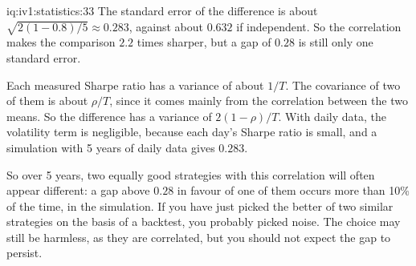 \begin{solution}{iq:iv1:statistics:33}
The standard error of the difference is about $\sqrt{2(1 - 0.8)/5} \approx 0.283$, against about $0.632$ if independent. So the correlation makes the comparison $2.2$ times sharper, but a gap of $0.28$ is still only one standard error.

Each measured Sharpe ratio has a variance of about $1/T$. The covariance of two of them is about $\rho/T$, since it comes mainly from the correlation between the two means. So the difference has a variance of $2(1 - \rho)/T$. With daily data, the volatility term is negligible, because each day's Sharpe ratio is small, and a simulation with 5 years of daily data gives $0.283$.

So over 5 years, two equally good strategies with this correlation will often appear different: a gap above $0.28$ in favour of one of them occurs more than 10\% of the time, in the simulation. If you have just picked the better of two similar strategies on the basis of a backtest, you probably picked noise. The choice may still be harmless, as they are correlated, but you should not expect the gap to persist.

\end{solution}

